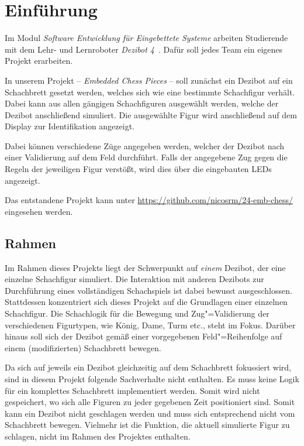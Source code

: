 
\section{Einführung}

Im Modul \emph{Software Entwicklung für Eingebettete Systeme} arbeiten Studierende mit dem Lehr- und Lernroboter \emph{Dezibot 4}~\cite{dezibotteamDezibotDezibot2025}. Dafür soll jedes Team ein eigenes Projekt erarbeiten.

In unserem Projekt -- \emph{Embedded Chess Pieces} -- soll zunächst ein Dezibot auf ein Schachbrett gesetzt werden, welches sich wie eine bestimmte Schachfigur verhält. Dabei kann aus allen gängigen Schachfiguren ausgewählt werden, welche der Dezibot anschließend simuliert. Die ausgewählte Figur wird anschließend auf dem Display zur Identifikation angezeigt.

Dabei können verschiedene Züge angegeben werden, welcher der Dezibot nach einer Validierung auf dem Feld durchführt. Falls der angegebene Zug gegen die Regeln der jeweiligen Figur verstößt, wird dies über die eingebauten LEDs angezeigt.

Das entstandene Projekt kann unter \url{https://github.com/nicosrm/24-emb-chess/} eingesehen werden.


\subsection{Rahmen}

Im Rahmen dieses Projekts liegt der Schwerpunkt auf \emph{einem} Dezibot, der eine einzelne Schachfigur simuliert. Die Interaktion mit anderen Dezibots zur Durchführung eines vollständigen Schachspiels ist dabei bewusst ausgeschlossen. Stattdessen konzentriert sich dieses Projekt auf die Grundlagen einer einzelnen Schachfigur. Die Schachlogik für die Bewegung und Zug"=Validierung der verschiedenen Figurtypen, wie König, Dame, Turm etc., steht im Fokus. Darüber hinaus soll sich der Dezibot gemäß einer vorgegebenen Feld"=Reihenfolge auf einem (modifizierten) Schachbrett bewegen.


Da sich auf jeweils ein Dezibot gleichzeitig auf dem Schachbrett fokussiert wird, sind in diesem Projekt folgende Sachverhalte nicht enthalten. Es muss keine Logik für ein komplettes Schachbrett implementiert werden. Somit wird nicht gespeichert, wo sich alle Figuren zu jeder gegebenen Zeit positioniert sind. Somit kann ein Dezibot nicht geschlagen werden und muss sich entsprechend nicht vom Schachbrett bewegen. Vielmehr ist die Funktion, die aktuell simulierte Figur zu schlagen, nicht im Rahmen des Projektes enthalten.


